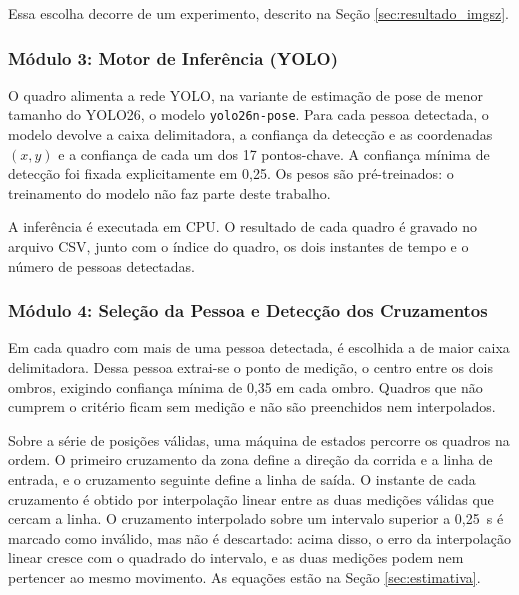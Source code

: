 \documentclass[
    12pt,               %
    openright,          %
    twoside,            %
    a4paper,            %
    chapter=TITLE,      %
    english,            %
    brazil              %
    ]{abntex2}
\begin{document}
Essa escolha decorre de um experimento, descrito na Seção \ref{sec:resultado_imgsz}.

\subsubsection{Módulo 3: Motor de Inferência (YOLO)}
O quadro alimenta a rede YOLO, na variante de estimação de pose de menor tamanho do YOLO26, o modelo \texttt{yolo26n-pose}. Para cada pessoa detectada, o modelo devolve a caixa delimitadora, a confiança da detecção e as coordenadas $(x, y)$ e a confiança de cada um dos 17 pontos-chave. A confiança mínima de detecção foi fixada explicitamente em 0,25. Os pesos são pré-treinados: o treinamento do modelo não faz parte deste trabalho.

A inferência é executada em CPU. O resultado de cada quadro é gravado no arquivo CSV, junto com o índice do quadro, os dois instantes de tempo e o número de pessoas detectadas.

\subsubsection{Módulo 4: Seleção da Pessoa e Detecção dos Cruzamentos}
Em cada quadro com mais de uma pessoa detectada, é escolhida a de maior caixa delimitadora. Dessa pessoa extrai-se o ponto de medição, o centro entre os dois ombros, exigindo confiança mínima de 0,35 em cada ombro. Quadros que não cumprem o critério ficam sem medição e não são preenchidos nem interpolados.

Sobre a série de posições válidas, uma máquina de estados percorre os quadros na ordem. O primeiro cruzamento da zona define a direção da corrida e a linha de entrada, e o cruzamento seguinte define a linha de saída. O instante de cada cruzamento é obtido por interpolação linear entre as duas medições válidas que cercam a linha. O cruzamento interpolado sobre um intervalo superior a 0,25~s é marcado como inválido, mas não é descartado: acima disso, o erro da interpolação linear cresce com o quadrado do intervalo, e as duas medições podem nem pertencer ao mesmo movimento. As equações estão na Seção \ref{sec:estimativa}.
\end{document}
